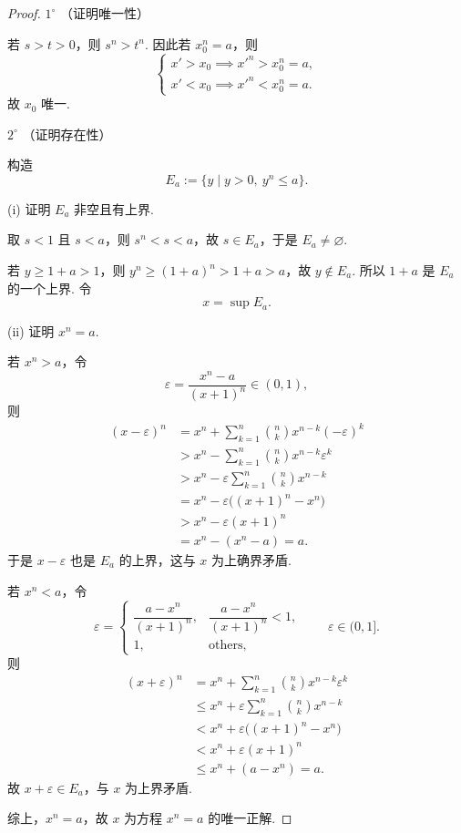 \begin{proof}
$1^\circ$ （证明唯一性）

若 $s>t>0$，则 $s^n>t^n$. 因此若 $x_0^n=a$，则
\[
\begin{cases}
x'>x_0 \implies x'^n>x_0^n=a,\\
x'<x_0 \implies x'^n<x_0^n=a.
\end{cases}
\]
故 $x_0$ 唯一. 

$2^\circ$ （证明存在性）

构造
\[
E_a:=\{y \mid y>0,\ y^n\le a\}.
\]

(i) 证明 $E_a$ 非空且有上界. 

取 $s<1$ 且 $s<a$，则 $s^n<s<a$，故 $s \in E_a$，于是 $E_a \ne \varnothing$. 

若 $y \ge 1+a > 1$，则 $y^n \ge (1+a)^n > 1+a > a$，故 $y \notin E_a$. 
所以 $1+a$ 是 $E_a$ 的一个上界. 令
\[
x=\sup E_a.
\]

(ii) 证明 $x^n=a$. 

若 $x^n>a$，令
\[
\varepsilon=\frac{x^n-a}{(x+1)^n}\in(0,1),
\]
则
\[
\begin{aligned}
(x-\varepsilon)^n
&=x^n+\sum_{k=1}^n \binom{n}{k}x^{n-k}(-\varepsilon)^k \\
&>x^n-\sum_{k=1}^n \binom{n}{k}x^{n-k}\varepsilon^k \\
&>x^n-\varepsilon \sum_{k=1}^n \binom{n}{k}x^{n-k} \\
&=x^n-\varepsilon\big((x+1)^n-x^n\big) \\
&>x^n-\varepsilon(x+1)^n \\
&=x^n-(x^n-a)=a.
\end{aligned}
\]
于是 $x-\varepsilon$ 也是 $E_a$ 的上界，这与 $x$ 为上确界矛盾. 

若 $x^n<a$，令
\[
\varepsilon=
\begin{cases}
\dfrac{a-x^n}{(x+1)^n}, & \dfrac{a-x^n}{(x+1)^n}<1,\\[0.4em]
1, & \text{others},
\end{cases}
\qquad \varepsilon \in (0,1].
\]
则
\[
\begin{aligned}
(x+\varepsilon)^n
&=x^n+\sum_{k=1}^n \binom{n}{k}x^{n-k}\varepsilon^k \\
&\le x^n+\varepsilon \sum_{k=1}^n \binom{n}{k}x^{n-k} \\
&<x^n+\varepsilon\big((x+1)^n-x^n\big) \\
&<x^n+\varepsilon(x+1)^n \\
&\le x^n+(a-x^n)=a.
\end{aligned}
\]
故 $x+\varepsilon \in E_a$，与 $x$ 为上界矛盾. 

综上，$x^n=a$，故 $x$ 为方程 $x^n=a$ 的唯一正解. 
\end{proof}

